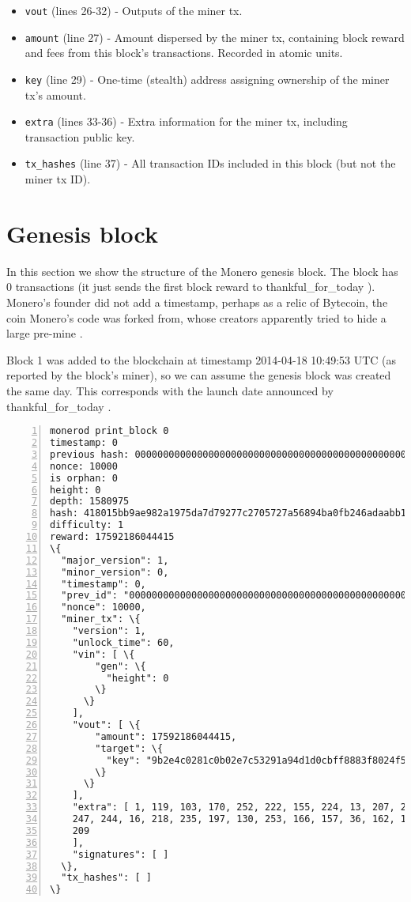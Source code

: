 \begin{appendices}
\begin{itemize}
    \item {\tt vout} (lines 26-32) - Outputs of the miner tx.
    \item {\tt amount} (line 27) - Amount dispersed by the miner tx, containing block reward and fees from this block's transactions. Recorded in atomic units.
    \item {\tt key} (line 29) - One-time (stealth) address assigning ownership of the miner tx's amount.
    \item {\tt extra} (lines 33-36) - Extra information for the miner tx, including transaction public key.
    \item {\tt tx\_hashes} (line 37) - All transaction IDs included in this block (but not the miner tx ID).
\end{itemize}




\chapter{Genesis block}
\label{appendix:genesis-block}

In this section we show the structure of the Monero genesis block. The block has 0 transactions (it just sends the first block reward to thankful\_for\_today \cite{bitmonero-launched}). Monero's founder did not add a timestamp, perhaps as a relic of Bytecoin, the coin Monero's code was forked from, whose creators apparently tried to hide a large pre-mine \cite{monero-history}.

Block 1 was added to the blockchain at timestamp 2014-04-18 10:49:53 UTC (as reported by the block's miner), so we can assume the genesis block was created the same day. This corresponds with the launch date announced by thankful\_for\_today \cite{bitmonero-launched}.

\begin{Verbatim}[commandchars=\\\{\}, numbers=left]
monerod print_block 0
timestamp: 0
previous hash: 0000000000000000000000000000000000000000000000000000000000000000
nonce: 10000
is orphan: 0
height: 0
depth: 1580975
hash: 418015bb9ae982a1975da7d79277c2705727a56894ba0fb246adaabb1f4632e3
difficulty: 1
reward: 17592186044415
\{
  "major_version": 1,
  "minor_version": 0,
  "timestamp": 0,
  "prev_id": "0000000000000000000000000000000000000000000000000000000000000000",
  "nonce": 10000,
  "miner_tx": \{
    "version": 1,
    "unlock_time": 60,
    "vin": [ \{
        "gen": \{
          "height": 0
        \}
      \}
    ],
    "vout": [ \{
        "amount": 17592186044415,
        "target": \{
          "key": "9b2e4c0281c0b02e7c53291a94d1d0cbff8883f8024f5142ee494ffbbd088071"
        \}
      \}
    ],
    "extra": [ 1, 119, 103, 170, 252, 222, 155, 224, 13, 207, 208, 152, 113, 94, 188, 
    247, 244, 16, 218, 235, 197, 130, 253, 166, 157, 36, 162, 142, 157, 11, 200, 144, 
    209
    ],
    "signatures": [ ]
  \},
  "tx_hashes": [ ]
\}
\end{Verbatim}



\end{appendices}
